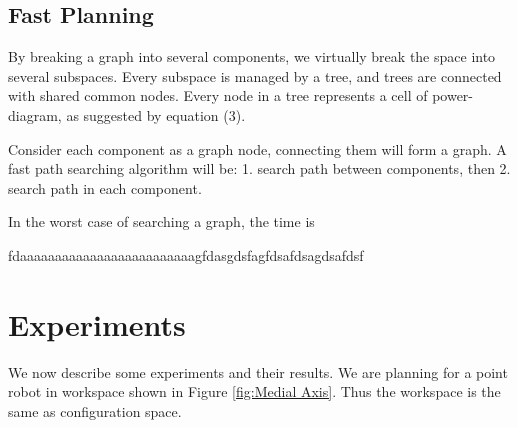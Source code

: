 \documentclass[11pt]{article}
\newtheorem{theorem}{Theorem}[section]
\begin{document}

  \subsection{Fast Planning}
  \indent\indent By breaking a graph into several components, we virtually break the space into several subspaces. Every subspace is managed by a tree, and trees are connected with shared common nodes. Every node in a tree represents a cell of power-diagram, as suggested by equation (3). 
 
  \indent Consider each component as a graph node, connecting them will form a graph. A fast path searching algorithm will be: 1. search path between components, then 2. search path in each component. 
  
  \indent In the worst case of searching a graph, the time is 
  
  \indent fdaaaaaaaaaaaaaaaaaaaaaaaaagfdasgdsfagfdsafdsagdsafdsf
  

%
\section{Experiments}\label{experiments}
\indent\indent We now describe some experiments and their results. We are planning for a point robot in workspace shown in Figure \ref{fig:Medial Axis}. Thus the workspace is the same as configuration space. 
\end{document}
